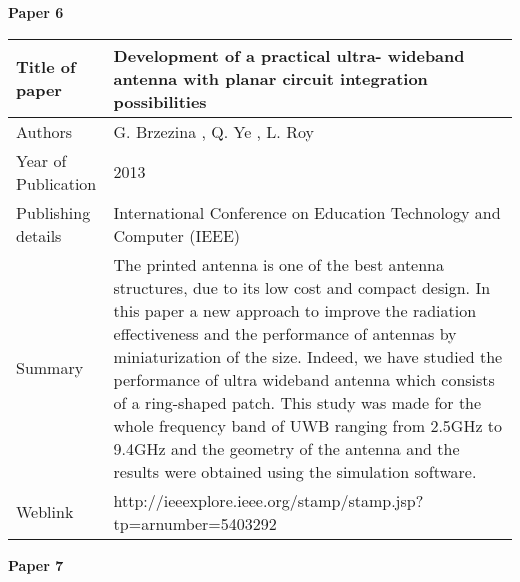 \documentclass[12pt]{article}
\begin{document}
	    	\begin{flushleft}
	    		\textbf{Paper 6}
	    	\end{flushleft}
	    	

		  \begin{center}
		  	\begin{table}[H]
		  		\centering
		  		\begin{tabular}{ |l|p{11cm}| }
		  			\hline
		  			Title of paper &  Development of a practical ultra- wideband antenna with planar circuit integration possibilities \\
		  			\hline
		  			Authors & G. Brzezina , Q. Ye , L. Roy \\
		  			\hline
		  			Year of Publication & 2013 \\
		  			\hline
		  			Publishing details & International Conference on Education Technology and Computer (IEEE) \\ \hline
		  			Summary & The printed antenna is one of the best antenna structures, due to its low cost and compact design. In this paper a new approach to improve the radiation effectiveness and the performance of antennas by miniaturization of the size. Indeed, we have studied the performance of ultra wideband antenna which consists of a ring-shaped patch. This study was made for the whole frequency band of UWB ranging from 2.5GHz to 9.4GHz and the geometry of the antenna and the results were obtained using the simulation software. \\
		  			\hline
		  			Weblink & http://ieeexplore.ieee.org/stamp/stamp.jsp?tp=arnumber=5403292 \\
		  			\hline			 
		  		\end{tabular}		
		  		
		  	\end{table}
		  \end{center}
		  
		\cleardoublepage
			
			\begin{flushleft}
				\textbf{Paper 7}
			\end{flushleft}
			
\end{document}
